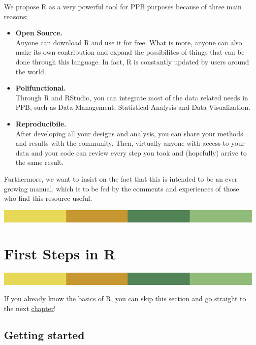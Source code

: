 \documentclass[
]{book}
\begin{document}
We propose R as a very powerful tool for PPB purposes because of three main reasons:

\begin{itemize}
\item
  \textbf{Open Source. }\\
  Anyone can download R and use it for free. What is more, anyone can also make its own contribution and expand the possibilites of things that can be done through this language. In fact, R is constantly updated by users around the world.
\item
  \textbf{Polifunctional. }\\
  Through R and RStudio, you can integrate most of the data related needs in PPB, such as Data Management, Statistical Analysis and Data Visualization.
\item
  \textbf{Reproducibile. }\\
  After developing all your designs and analysis, you can share your methods and results with the community. Then, virtually anyone with access to your data and your code can review every step you took and (hopefully) arrive to the same result.
\end{itemize}

Furthermore, we want to insist on the fact that this is intended to be an ever growing manual, which is to be fed by the comments and experiences of those who find this resource useful.

\includegraphics{rsrstrip.png}

\hypertarget{first-steps-in-r}{%
\chapter{First Steps in R}\label{first-steps-in-r}}

\includegraphics{rsrstrip.png}

If you already know the basics of R, you can skip this section and go straight to the next \protect\hyperlink{data-wrangling-and-summarizing}{chapter}!

\hypertarget{getting-started}{%
\section{Getting started}\label{getting-started}}
\end{document}
